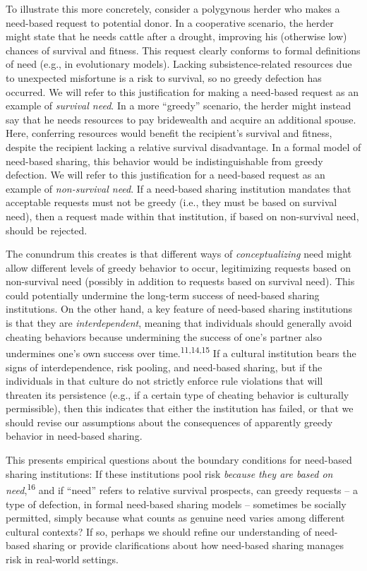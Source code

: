 \documentclass[
]{article}
\begin{document}
To illustrate this more concretely, consider a polygynous herder who makes a need-based request to potential donor. In a cooperative scenario, the herder might state that he needs cattle after a drought, improving his (otherwise low) chances of survival and fitness. This request clearly conforms to formal definitions of need (e.g., in evolutionary models). Lacking subsistence-related resources due to unexpected misfortune is a risk to survival, so no greedy defection has occurred. We will refer to this justification for making a need-based request as an example of \emph{survival need}. In a more ``greedy'' scenario, the herder might instead say that he needs resources to pay bridewealth and acquire an additional spouse. Here, conferring resources would benefit the recipient's survival and fitness, despite the recipient lacking a relative survival disadvantage. In a formal model of need-based sharing, this behavior would be indistinguishable from greedy defection. We will refer to this justification for a need-based request as an example of \emph{non-survival need}. If a need-based sharing institution mandates that acceptable requests must not be greedy (i.e., they must be based on survival need), then a request made within that institution, if based on non-survival need, should be rejected.

The conundrum this creates is that different ways of \emph{conceptualizing} need might allow different levels of greedy behavior to occur, legitimizing requests based on non-survival need (possibly in addition to requests based on survival need). This could potentially undermine the long-term success of need-based sharing institutions. On the other hand, a key feature of need-based sharing institutions is that they are \emph{interdependent}, meaning that individuals should generally avoid cheating behaviors because undermining the success of one's partner also undermines one's own success over time.\textsuperscript{11,14,15} If a cultural institution bears the signs of interdependence, risk pooling, and need-based sharing, but if the individuals in that culture do not strictly enforce rule violations that will threaten its persistence (e.g., if a certain type of cheating behavior is culturally permissible), then this indicates that either the institution has failed, or that we should revise our assumptions about the consequences of apparently greedy behavior in need-based sharing.

This presents empirical questions about the boundary conditions for need-based sharing institutions: If these institutions pool risk \emph{because they are based on need},\textsuperscript{16} and if ``need'' refers to relative survival prospects, can greedy requests -- a type of defection, in formal need-based sharing models -- sometimes be socially permitted, simply because what counts as genuine need varies among different cultural contexts? If so, perhaps we should refine our understanding of need-based sharing or provide clarifications about how need-based sharing manages risk in real-world settings.
\end{document}
